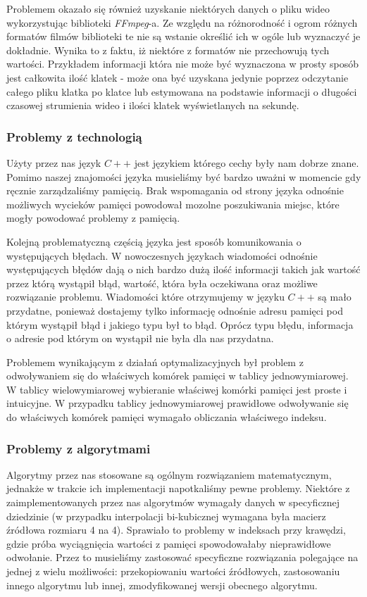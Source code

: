 \documentclass[twoside]{projektInzynierskiMS}
\begin{document}
Problemem okazało się również uzyskanie niektórych danych o pliku wideo wykorzystując biblioteki \emph{FFmpeg}-a. Ze względu na różnorodność i ogrom różnych formatów filmów biblioteki te nie są wstanie określić ich w ogóle lub wyznaczyć je dokładnie. Wynika to z faktu, iż niektóre z formatów nie przechowują tych wartości. Przykładem informacji która nie może być wyznaczona w prosty sposób jest całkowita ilość klatek - może ona być uzyskana jedynie poprzez odczytanie całego pliku klatka po klatce lub estymowana na podstawie informacji o długości czasowej strumienia wideo i ilości klatek wyświetlanych na sekundę.

\subsubsection{Problemy z technologią}
Użyty przez nas język $C++$ jest językiem którego cechy były nam dobrze znane. Pomimo naszej znajomości języka musieliśmy być bardzo uważni w momencie gdy ręcznie zarządzaliśmy pamięcią. Brak wspomagania od strony języka odnośnie możliwych wycieków pamięci powodował mozolne poszukiwania miejsc, które mogły powodować problemy z pamięcią. 

Kolejną problematyczną częścią języka jest sposób komunikowania o występujących błędach. W nowoczesnych językach wiadomości odnośnie występujących błędów dają o nich bardzo dużą ilość informacji takich jak wartość przez którą wystąpił błąd, wartość, która była oczekiwana oraz możliwe rozwiązanie problemu. Wiadomości które otrzymujemy w języku $C++$ są mało przydatne, ponieważ dostajemy tylko informację odnośnie adresu pamięci pod którym wystąpił błąd i jakiego typu był to błąd. Oprócz typu błędu, informacja o adresie pod którym on wystąpił nie była dla nas przydatna.

Problemem wynikającym z działań optymalizacyjnych był problem z odwoływaniem się do właściwych komórek pamięci w tablicy jednowymiarowej. W tablicy wielowymiarowej wybieranie właściwej komórki pamięci jest proste i intuicyjne. W przypadku tablicy jednowymiarowej prawidłowe odwoływanie się do właściwych komórek pamięci wymagało obliczania właściwego indeksu.

\subsubsection{Problemy z algorytmami}
Algorytmy przez nas stosowane są ogólnym rozwiązaniem matematycznym, jednakże w trakcie ich implementacji napotkaliśmy pewne problemy. Niektóre z zaimplementowanych przez nas algorytmów wymagały danych w specyficznej dziedzinie (w przypadku interpolacji bi-kubicznej wymagana była macierz źródłowa rozmiaru 4 na 4). Sprawiało to problemy w indeksach przy krawędzi, gdzie próba wyciągnięcia wartości z pamięci spowodowałaby nieprawidłowe odwołanie. Przez to musieliśmy zastosować specyficzne rozwiązania polegające na jednej z wielu możliwości: przekopiowaniu wartości źródłowych, zastosowaniu innego algorytmu lub innej, zmodyfikowanej wersji obecnego algorytmu.
\end{document}
